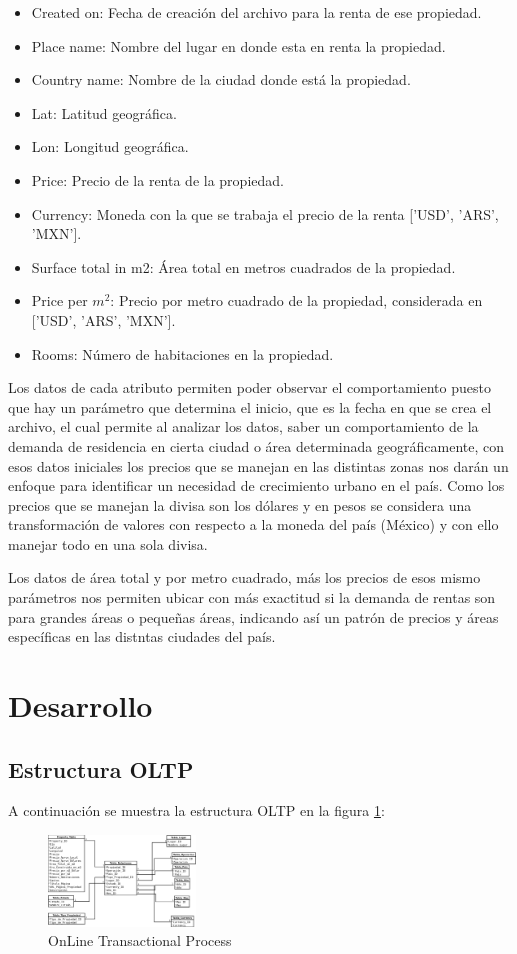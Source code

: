 \documentclass[a4paper,12pt]{article}
\begin{document}
\begin{itemize}
\item Created on: Fecha de creación del archivo para la renta de ese propiedad.
\item Place name: Nombre del lugar en donde esta en renta la propiedad.
\item Country name: Nombre de la ciudad donde está la propiedad.
\item Lat: Latitud geográfica.
\item Lon: Longitud geográfica.
\item Price: Precio de la renta de la propiedad.
\item Currency: Moneda con la que se trabaja el precio de la renta ['USD', 'ARS', 'MXN'].
\item Surface total in m2: Área total en metros cuadrados de la propiedad.
\item Price per $m^2$: Precio por metro cuadrado de la propiedad, considerada en ['USD', 'ARS', 'MXN'].
\item Rooms: Número de habitaciones en la propiedad.
\end{itemize}

Los datos de cada atributo permiten poder observar el comportamiento puesto que hay un parámetro que determina el inicio, 
que es la fecha en que se crea el archivo, el cual permite al analizar los datos, saber un comportamiento de la demanda 
de residencia en cierta ciudad o área determinada geográficamente, con esos datos iniciales los precios que se manejan en las 
distintas zonas nos darán un enfoque para identificar un necesidad de crecimiento urbano en el país. Como los precios que se 
manejan la divisa son los dólares y en pesos se considera una transformación de valores con respecto a la moneda del país (México) 
y con ello manejar todo en una sola divisa.
\vspace{5mm}

Los datos de área total y por metro cuadrado, más los precios de esos mismo parámetros nos permiten ubicar con más exactitud si la 
demanda de rentas son para grandes áreas o pequeñas áreas, indicando así un patrón de precios y áreas específicas en las distntas 
ciudades del país.
\section{Desarrollo}
\subsection{Estructura OLTP}
A continuación se muestra la estructura OLTP en la figura \ref{fig:1}:
\begin{figure}[H]
\begin{center}
\includegraphics[width=0.35\textwidth]{OLTP_2904_PRO.png}
\caption{OnLine Transactional Process}\label{fig:1}
\end{center} 
\end{figure}
\end{document}
